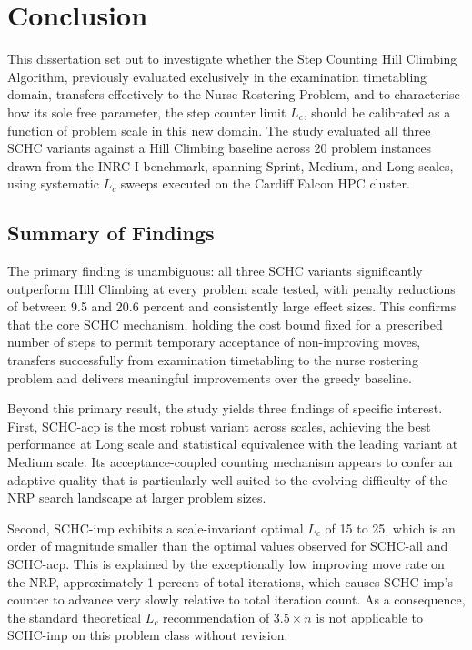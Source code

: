 \documentclass[12pt, a4paper, oneside]{report}
\begin{document}
\chapter{Conclusion}
\label{ch:conclusion}

This dissertation set out to investigate whether the Step Counting
Hill Climbing Algorithm, previously evaluated exclusively in the
examination timetabling domain, transfers effectively to the Nurse
Rostering Problem, and to characterise how its sole free parameter,
the step counter limit $L_c$, should be calibrated as a function of
problem scale in this new domain. The study evaluated all three SCHC
variants against a Hill Climbing baseline across 20 problem instances
drawn from the INRC-I benchmark, spanning Sprint, Medium,
and Long scales, using systematic $L_c$ sweeps executed on
the Cardiff Falcon HPC cluster.

\section{Summary of Findings}
\label{sec:conc_summary}

The primary finding is unambiguous: all three SCHC variants
significantly outperform Hill Climbing at every problem scale tested,
with penalty reductions of between 9.5 and 20.6 percent and
consistently large effect sizes. This confirms that the core SCHC
mechanism, holding the cost bound fixed for a prescribed number of
steps to permit temporary acceptance of non-improving moves,
transfers successfully from examination timetabling to the nurse
rostering problem and delivers meaningful improvements over the
greedy baseline.

Beyond this primary result, the study yields three findings of
specific interest. First, SCHC-acp is the most robust variant across
scales, achieving the best performance at Long scale and statistical
equivalence with the leading variant at Medium scale. Its
acceptance-coupled counting mechanism appears to confer an adaptive
quality that is particularly well-suited to the evolving difficulty
of the NRP search landscape at larger problem sizes.

Second, SCHC-imp exhibits a scale-invariant optimal $L_c$ of 15 to
25, which is an order of magnitude smaller than the optimal values
observed for SCHC-all and SCHC-acp. This is explained by the
exceptionally low improving move rate on the NRP, approximately 1
percent of total iterations, which causes SCHC-imp's counter to
advance very slowly relative to total iteration count. As a
consequence, the standard theoretical $L_c$ recommendation of
$3.5 \times n$ is not applicable to SCHC-imp on this problem class
without revision.
\end{document}
